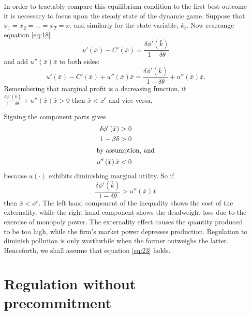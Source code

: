 \documentclass{amsart}
\begin{document}
In order to tractably compare this equilibrium condition to the first
best outcome it is necessary to focus upon the steady state of the
dynamic game. Suppose that $x_1 = x_2 = \ldots = x_T = \bar{x}$, and
similarly for the state variable, $k_t$. Now rearrange equation
\eqref{eq:18}
\begin{equation}
  \label{eq:20}
  u'\left( \bar{x}\right) - C'\left( \bar{x}\right) =
  \frac{\delta\phi'\left( \bar{k}\right)}{1-\delta\theta}
\end{equation}
and add $u''\left( \bar{x}\right) \bar{x}$ to both sides:
\begin{equation}
  \label{eq:21} 
  u'\left( \bar{x}\right) - C'\left( \bar{x}\right) +
  u''\left( \bar{x}\right) \bar{x} = \frac{\delta\phi'\left(
      \bar{k}\right)}{1-\delta\theta} + u''\left( \bar{x}\right)
  \bar{x}. 
\end{equation}
Remembering that marginal profit is a decreasing function, if
$\frac{\delta\phi'\left( \bar{k}\right)}{1-\delta\theta} + u''\left(
  \bar{x}\right) \bar{x} > 0$ then $\bar{x} < x^{\ell}$ and vice
versa.

Signing the component parts gives
\begin{align}
  \label{eq:22}
  \delta\phi'\left( \bar{x}\right) &> 0 \\
  1-\beta\delta &> 0 \\
  \intertext{by assumption, and} 
  u''\left( \bar{x}\right) \bar{x} &< 0
\end{align}
because $u(\cdot)$ exhibits diminishing marginal utility. So if
\begin{equation}
  \label{eq:23}
  \frac{\delta\phi'\left( \bar{k}\right)}{1-\delta\theta} > u''\left(
    \bar{x}\right) \bar{x}
\end{equation}
then $\bar{x} < x^{\ell}$. The left hand component of the inequality shows the
cost of the externality, while the right hand component shows the
deadweight loss due to the exercise of monopoly power. The externality
effect causes the quantity produced to be too high, while the firm's
market power depresses production. Regulation to diminish pollution is
only worthwhile when the former outweighs the latter. Henceforth, we
shall assume that equation \eqref{eq:23} holds.


\section{Regulation without precommitment}
\label{sec:regul-with-prec-2}
\end{document}
